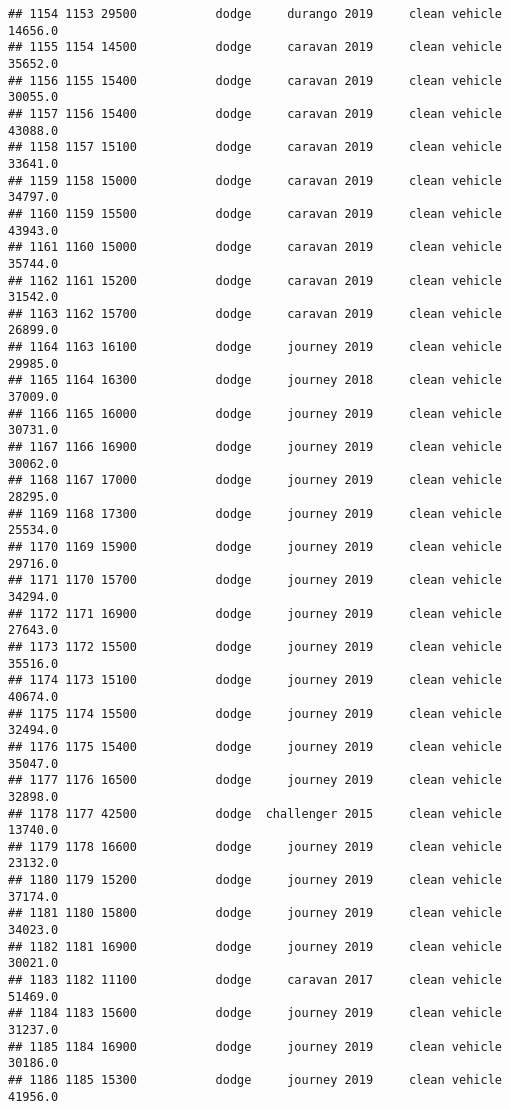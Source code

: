 \documentclass[
]{article}
\begin{document}
\begin{verbatim}
## 1154 1153 29500           dodge     durango 2019     clean vehicle   14656.0
## 1155 1154 14500           dodge     caravan 2019     clean vehicle   35652.0
## 1156 1155 15400           dodge     caravan 2019     clean vehicle   30055.0
## 1157 1156 15400           dodge     caravan 2019     clean vehicle   43088.0
## 1158 1157 15100           dodge     caravan 2019     clean vehicle   33641.0
## 1159 1158 15000           dodge     caravan 2019     clean vehicle   34797.0
## 1160 1159 15500           dodge     caravan 2019     clean vehicle   43943.0
## 1161 1160 15000           dodge     caravan 2019     clean vehicle   35744.0
## 1162 1161 15200           dodge     caravan 2019     clean vehicle   31542.0
## 1163 1162 15700           dodge     caravan 2019     clean vehicle   26899.0
## 1164 1163 16100           dodge     journey 2019     clean vehicle   29985.0
## 1165 1164 16300           dodge     journey 2018     clean vehicle   37009.0
## 1166 1165 16000           dodge     journey 2019     clean vehicle   30731.0
## 1167 1166 16900           dodge     journey 2019     clean vehicle   30062.0
## 1168 1167 17000           dodge     journey 2019     clean vehicle   28295.0
## 1169 1168 17300           dodge     journey 2019     clean vehicle   25534.0
## 1170 1169 15900           dodge     journey 2019     clean vehicle   29716.0
## 1171 1170 15700           dodge     journey 2019     clean vehicle   34294.0
## 1172 1171 16900           dodge     journey 2019     clean vehicle   27643.0
## 1173 1172 15500           dodge     journey 2019     clean vehicle   35516.0
## 1174 1173 15100           dodge     journey 2019     clean vehicle   40674.0
## 1175 1174 15500           dodge     journey 2019     clean vehicle   32494.0
## 1176 1175 15400           dodge     journey 2019     clean vehicle   35047.0
## 1177 1176 16500           dodge     journey 2019     clean vehicle   32898.0
## 1178 1177 42500           dodge  challenger 2015     clean vehicle   13740.0
## 1179 1178 16600           dodge     journey 2019     clean vehicle   23132.0
## 1180 1179 15200           dodge     journey 2019     clean vehicle   37174.0
## 1181 1180 15800           dodge     journey 2019     clean vehicle   34023.0
## 1182 1181 16900           dodge     journey 2019     clean vehicle   30021.0
## 1183 1182 11100           dodge     caravan 2017     clean vehicle   51469.0
## 1184 1183 15600           dodge     journey 2019     clean vehicle   31237.0
## 1185 1184 16900           dodge     journey 2019     clean vehicle   30186.0
## 1186 1185 15300           dodge     journey 2019     clean vehicle   41956.0

\end{verbatim}
\end{document}
